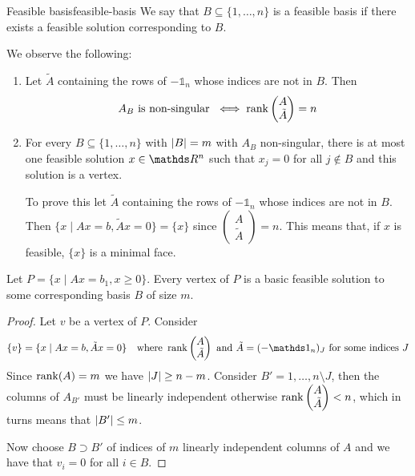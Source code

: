 \documentclass[12pt]{extarticle}
\begin{document}
\begin{definition}{Feasible basis}{feasible-basis}
	We say that $B \subseteq \{1, \dots, n\}$ is a feasible basis if there exists a feasible solution
	corresponding to $B$.
\end{definition}

We observe the following:
\begin{enumerate}[label=\roman*.]
	\item Let $\tilde A$ containing the rows of $- \mathds 1_n$ whose indices are not in $B$.
	      Then
	      \begin{equation}
		      A_B \text{ is non-singular } \iff \rank\begin{pmatrix}A \\ \tilde A \end{pmatrix} = n
	      \end{equation}

	\item For every $B \subseteq \{1, \dots, n\}$ with $\abs{B} = m$ with $A_B$ non-singular,
	      there is at most one feasible solution $x \in \R^n$ such that $x_j = 0$ for all $j \notin B$
	      and this solution is a vertex.

	      To prove this let $\tilde A$ containing the rows of $- \mathds 1_n$ whose indices are not in $B$.
	      Then $\{x \mid Ax = b, \tilde A x = 0 \} = \{x\}$ since
	      $\begin{pmatrix}A \\ \tilde A \end{pmatrix} = n$.
	      This means that, if $x$ is feasible, $\{x\}$ is a minimal face.
\end{enumerate}

\begin{lemma}{}{}
	Let $P = \{ x \mid Ax = b_1, x \geq 0 \}$.
	Every vertex of $P$ is a basic feasible solution to some corresponding basis $B$ of size $m$.
\end{lemma}

\begin{proof}
	Let $v$ be a vertex of $P$.
	Consider
	\begin{equation}
		\{v\} = \{ x \mid A x = b, \tilde A x = 0\} \quad \text{where }
		\rank\begin{pmatrix}A \\ \tilde A \end{pmatrix} \text{ and } \tilde A = (-\mathds 1_n)_J \text{ for some indices } J
	\end{equation}
	Since $\rank(A) = m$ we have $\abs{J} \geq n - m$.
	Consider $B' = {1, \dots, n} \setminus J$, then the columns of $A_{B'}$ must
	be linearly independent otherwise $\rank \begin{pmatrix}A \\ \tilde A \end{pmatrix} < n$,
	which in turns means that $\abs{B'} \leq m$.

	Now choose $B \supset B'$ of indices of $m$ linearly independent columns of $A$
	and we have that $v_i = 0$ for all $i \in B$.
\end{proof}
\end{document}
